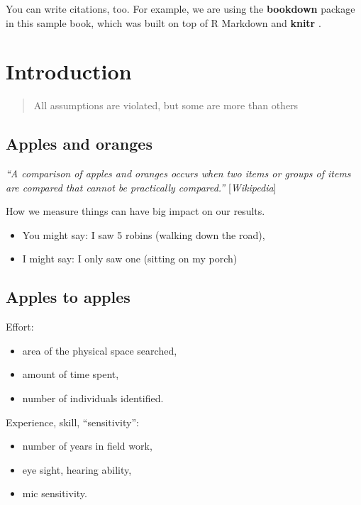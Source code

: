 \documentclass[12pt,]{scrbook}
\providecommand{\tightlist}{%
  \setlength{\itemsep}{0pt}\setlength{\parskip}{0pt}}
\begin{document}
You can write citations, too. For example, we are using the \textbf{bookdown} package \citep{R-bookdown} in this sample book, which was built on top of R Markdown and \textbf{knitr} \citep{xie2015}.

\hypertarget{intro}{%
\chapter{Introduction}\label{intro}}

\begin{quote}
All assumptions are violated, but some are more than others
\end{quote}

\hypertarget{apples-and-oranges}{%
\section{Apples and oranges}\label{apples-and-oranges}}

\emph{``A comparison of apples and oranges occurs when two items or groups of items are compared that
cannot be practically compared.''} {[}\emph{Wikipedia}{]}

How we measure things can have big impact on our results.

\begin{itemize}
\tightlist
\item
  You might say: I saw 5 robins (walking down the road),
\item
  I might say: I only saw one (sitting on my porch)
\end{itemize}

\hypertarget{apples-to-apples}{%
\section{Apples to apples}\label{apples-to-apples}}

Effort:

\begin{itemize}
\tightlist
\item
  area of the physical space searched,
\item
  amount of time spent,
\item
  number of individuals identified.
\end{itemize}

Experience, skill, ``sensitivity'':

\begin{itemize}
\tightlist
\item
  number of years in field work,
\item
  eye sight, hearing ability,
\item
  mic sensitivity.
\end{itemize}
\end{document}
